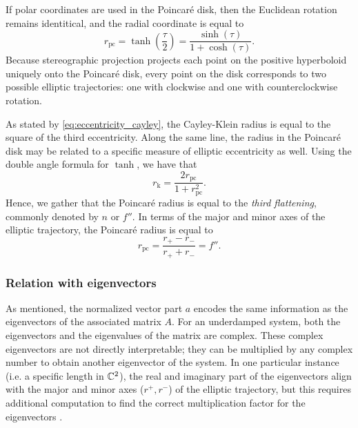 If polar coordinates are used in the Poincaré disk, then the Euclidean rotation remains identitical, and the radial coordinate is equal to
\begin{equation} 
    r_\text{pc} = \tanh(\frac{\tau}{2}) = \frac{\sinh(\tau)}{1 + \cosh(\tau)}. 
\end{equation}
Because stereographic projection projects each point on the positive hyperboloid uniquely onto the Poincaré disk, every point on the disk corresponds to two possible elliptic trajectories: one with clockwise and one with counterclockwise rotation.

As stated by \cref{eq:eccentricity_cayley}, the Cayley-Klein radius is equal to the square of the third eccentricity. Along the same line, the radius in the Poincaré disk may be related to a specific measure of elliptic eccentricity as well. Using the double angle formula for \( \tanh \), we have that
\begin{equation}
     r_\text{k} = \frac{2r_\text{pc}}{1 + r_\text{pc}^2}.
\end{equation}
Hence, we gather that the Poincaré radius is equal to the \emph{third flattening}, commonly denoted by \(n\) or \(f''\). In terms of the major and minor axes of the elliptic trajectory, the Poincaré radius is equal to
\begin{equation}
     r_\text{pc} = \frac{r_+ - r_-}{r_+ + r_-} = f''.
\end{equation}

\subsubsection{Relation with eigenvectors} 
As mentioned, the normalized vector part \(a\) encodes the same information as the eigenvectors of the associated matrix \(A\). For an underdamped system, both the eigenvectors and the eigenvalues of the matrix are complex. These complex eigenvectors are not directly interpretable; they can be multiplied by any complex number to obtain another eigenvector of the system. In one particular instance (i.e. a specific length in \(\mathbb{C}^2\)), the real and imaginary part of the eigenvectors align with the major and minor axes (\(r^+, r^-\)) of the elliptic trajectory, but this requires additional computation to find the correct multiplication factor for the eigenvectors \cite{Edwards2018}. 

